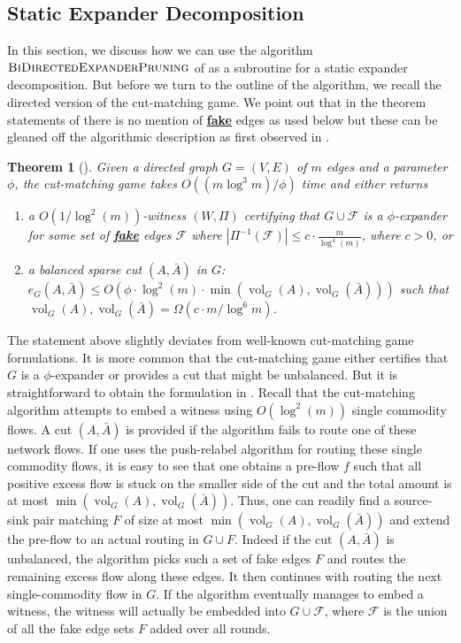 \documentclass[11pt]{article}
\newtheorem{theorem}{Theorem}[section]
\newcommand\ff{\boldsymbol{\mathit{f}}}
\DeclareMathOperator{\vol}{vol}
\begin{document}
\subsection{Static Expander Decomposition}
\label{subsec:staticExpDecom}
In this section, we discuss how we can use the algorithm $\textsc{BiDirectedExpanderPruning}$ of  as a subroutine for a static expander decomposition. But before we turn to the outline of the algorithm, we recall the directed version of the cut-matching game. We point out that in the theorem statements of \cite{khandekar2009graph,louis2010cut} there is no mention of \underline{\textbf{fake}} edges as used below but these can be gleaned off the algorithmic description as first observed in \cite{chuzhoy2020deterministic}.

\begin{theorem}[\cite{khandekar2009graph,louis2010cut}]\label{thm:CutMatching}
    Given a directed graph $G=(V, E)$ of $m$ edges and a parameter $\phi$, the cut-matching game takes $O((m \log^3 m) / \phi)$ time and either returns
    \begin{enumerate}
        \item \label{item:CM-thm1} a $O(1/\log^2(m))$-witness $(W, \Pi)$ certifying that $G \cup \mathcal{F}$ is a $\phi$-expander for some set of \underline{\textbf{fake}} edges $\mathcal{F}$ where $|\Pi^{-1}(\mathcal{F})| \leq c \cdot \frac{m}{\log^4(m)}$, where $c > 0$, or
        \item \label{item:CM-thm2} a balanced sparse cut $(A, \bar{A})$ in $G$: $e_G(A, \bar{A}) \leq O\left(\phi \cdot \log^2(m) \cdot \min(\vol_G(A) , \vol_G(\bar{A}))\right)$ such that $\vol_G(A), \vol_G(\bar{A}) = \Omega(c \cdot m/\log^6 m)$.
    \end{enumerate}
\end{theorem}

The statement above slightly deviates from well-known cut-matching game formulations. It is more common that the cut-matching game either certifies that $G$ is a $\phi$-expander or provides a cut that might be unbalanced. But it is straightforward to obtain the formulation in . Recall that the cut-matching algorithm attempts to embed a witness using $O(\log^2(m))$ single commodity flows. A cut $(A, \bar{A})$ is provided if the algorithm fails to route one of these network flows. If one uses the push-relabel algorithm for routing these single commodity flows, it is easy to see that one obtains a pre-flow $\ff$ such that all positive excess flow is stuck on the smaller side of the cut and the total amount is at most $\min(\vol_G(A), \vol_G(\bar{A}))$. Thus, one can readily find a source-sink pair matching $F$ of size at most $\min(\vol_G(A), \vol_G(\bar{A}))$ and extend the pre-flow to an actual routing in $G \cup F$. Indeed if the cut $(A, \bar{A})$ is unbalanced, the algorithm picks such a set of fake edges $F$ and routes the remaining excess flow along these edges. It then continues with routing the next single-commodity flow in $G$. If the algorithm eventually manages to embed a witness, the witness will actually be embedded into $G \cup \mathcal{F}$, where $\mathcal{F}$ is the union of all the fake edge sets $F$ added over all rounds. 
\end{document}
